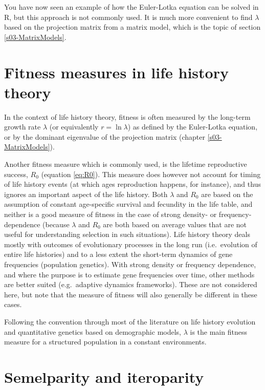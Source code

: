 \documentclass[
]{book}
\begin{document}
You have now seen an example of how the Euler-Lotka equation can be solved in R, but this approach is not commonly used. It is much more convenient to find \(\lambda\) based on the projection matrix from a matrix model, which is the topic of section \ref{s03-MatrixModels}.

\hypertarget{fitness-measures-in-life-history-theory}{%
\section{Fitness measures in life history theory}\label{fitness-measures-in-life-history-theory}}

In the context of life history theory, fitness is often measured by the long-term growth rate \(\lambda\) (or equivalently \(r=\ln\lambda\)) as defined by the Euler-Lotka equation, or by the dominant eigenvalue of the projection matrix (chapter \ref{s03-MatrixModels}).

Another fitness measure which is commonly used, is the lifetime reproductive success, \(R_0\) (equation \eqref{eq:R0}). This measure does however not account for timing of life history events (at which ages reproduction happens, for instance), and thus ignores an important aspect of the life history. Both \(\lambda\) and \(R_0\) are based on the assumption of constant age-specific survival and fecundity in the life table, and neither is a good measure of fitness in the case of strong density- or frequency-dependence (because \(\lambda\) and \(R_0\) are both based on average values that are not useful for understanding selection in such situations). Life history theory deals mostly with outcomes of evolutionary processes in the long run (i.e.~evolution of entire life histories) and to a less extent the short-term dynamics of gene frequencies (population genetics). With strong density or frequency dependence, and where the purpose is to estimate gene frequencies over time, other methods are better suited (e.g.~adaptive dynamics frameworks). These are not considered here, but note that the measure of fitness will also generally be different in these cases.

Following the convention through most of the literature on life history evolution and quantitative genetics based on demographic models, \(\lambda\) is the main fitness measure for a structured population in a constant environments.

\hypertarget{semelparity-and-iteroparity}{%
\section{Semelparity and iteroparity}\label{semelparity-and-iteroparity}}
\end{document}
